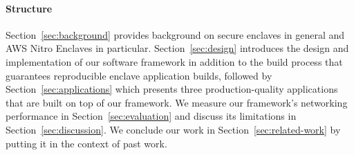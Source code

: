 \paragraph{Structure}

Section~\ref{sec:background} provides background on secure enclaves in general
and AWS Nitro Enclaves in particular.  Section~\ref{sec:design} introduces the
design and implementation of our software framework in addition to the build
process that guarantees reproducible enclave application builds, followed by
Section~\ref{sec:applications} which presents three production-quality
applications that are built on top of our framework.  We measure our framework's
networking performance in Section~\ref{sec:evaluation} and discuss its
limitations in Section~\ref{sec:discussion}.  We conclude our work in
Section~\ref{sec:related-work} by putting it in the context of past work.
